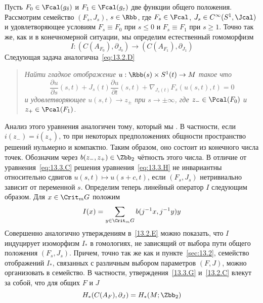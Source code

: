 Пусть $F_{0}\in\Fcal(g_{\delta})$ и $F_{1}\in\Fcal(g_{\epsilon})$ две
функции общего положения. 
Рассмотрим семейство $(F_{s}, J_{s})$, $s\in\Rbb$, где
$F_{s}\in\Fcal$, $J_{s}\in C^{\infty}(S^{1},\Jcal)$ и удовлетворяющее
условиям 
$F_{s}\equiv F_{0}$ при $s\leq0$ и $F_{s}\equiv F_{1}$ при $s\geq1$.
Точно так же, как и в конечномерной ситуации, мы определим
естественный гомоморфизм
\[
I:(C(A_{F_{0}}),\partial_{J_{0}})\to(C(A_{F_{1}}),\partial_{J_{1}})
\]
Следующая задача аналогична~\ref{eq:13.2.D}
\begin{quote}\em
  Найти гладкое отображение $u:\Rbb(s)\times S^{1}(t)\to M$
  такое что 
  \begin{equation}\label{eq:13.3.H}
    \frac{\partial u}{\partial s}(s,t)+
    J_{s}(t)\frac{\partial u}{\partial t}(s,t) +
    \nabla_{J_{s}(t)}F_{s}(u(s,t),t) = 0
  \end{equation}
  и удовлетворяющее $u(s,t)\to z_{\pm}$ при $s\to\pm\infty$, где
  $z_{-}\in\Pcal(F_{0})$ и $z_{+}\in\Pcal(F_{1})$.
\end{quote}
Анализ этого уравнения аналогичен тому, который мы .
В частности, если $i(z_{-})=i(z_{+})$, то при некоторых предположениях
общности пространство решений нульмерно и компактно. 
Таким образом, оно состоит из конечного числа точек.
Обозначим через $b(z_{-},z_{+})\in\Zbb_{2}$ чётность этого числа.
В отличие от уравнения~\ref{eq:13.3.C} решения
уравнения~\ref{eq:13.3.H} не инвариантны относительно сдвигов
$u(s,t)\mapsto u(s+c,t)$, если $(F_{s}, J_{s})$ нетривиально зависит
от переменной $s$.
Определим теперь линейный оператор $I$ следующим образом.
Для $x\in\Crit_{m}G$ положим
\[
I(x) = \sum_{y\in\Crit_{m}G}b(j^{-1}x,j^{-1}y)y
\]
Совершенно аналогично утверждениям в~\ref{13.2.E} можно показать, что
$I$ индуцирует изоморфизм $I_{*}$ в гомологиях, не зависящий от выбора пути общего положения $(F_{s}, J_{s})$.
Причем, точно так же как и пункте~\ref{sec:13.2}, семейство отображений
$I_{*}$, связанных с различным выбором параметров $(F,J)$, можно организовать в  семейство.
В частности, утверждения~\ref{13.3.G} и~\ref{13.2.C} влекут за собой,
что для общих $F$ и $J$
\[
H_{*}(C(A_{F}),\partial_{J}) = H_{*}(M;\Zbb_{2})
\]








